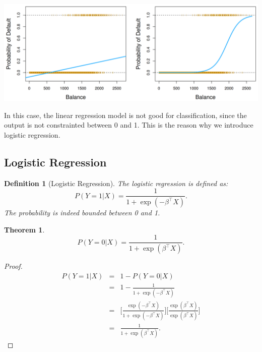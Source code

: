 \documentclass{article}
\theoremstyle{MyNonumberplain}
\theoremstyle{break}
\newtheorem*{proof}{Proof. }
\newcommand{\T}{^\intercal}
\theoremstyle{break}
\newtheorem{theorem}{Theorem}[section]
\newtheorem{definition}{Definition}[section]
\begin{document}
\begin{center}
    \includegraphics*[scale=0.2]{Images/img19.png}
\end{center}

In this case, the linear regression model is not good for classification, since the output is not constrainted between 0 and 1.
This is the reason why we introduce logistic regression.

\subsection{Logistic Regression}

\begin{defbox}
    \begin{definition}[Logistic Regression]
        The logistic regression is defined as: 
        $$
        P(Y=1|X)=\frac{1}{1+\exp(-\beta\T X)}.
        $$
        The probability is indeed bounded between 0 and 1.
    \end{definition}
\end{defbox}

\begin{thmbox}
    \begin{theorem}
        $$
        P(Y=0|X)=\frac{1}{1+\exp(\beta\T X)}.
        $$        
    \end{theorem}
    \begin{prfbox}
        \begin{proof}
            \begin{eqnarray*}
                P(Y=1|X) &=& 1 - P(Y=0|X)\\
                         &=& 1 - \frac{1}{1+\exp(-\beta\T X)}\\
                         &=& \Biggl[\frac{\exp(-\beta\T X)}{1+\exp(-\beta\T X)}\Biggr]\Biggl[\frac{\exp(\beta\T X)}{\exp(\beta\T X)}\Biggr]\\
                         &=& \frac{1}{1+\exp(\beta\T X)}.
            \end{eqnarray*}
        \end{proof}
    \end{prfbox}
\end{thmbox}
\end{document}
